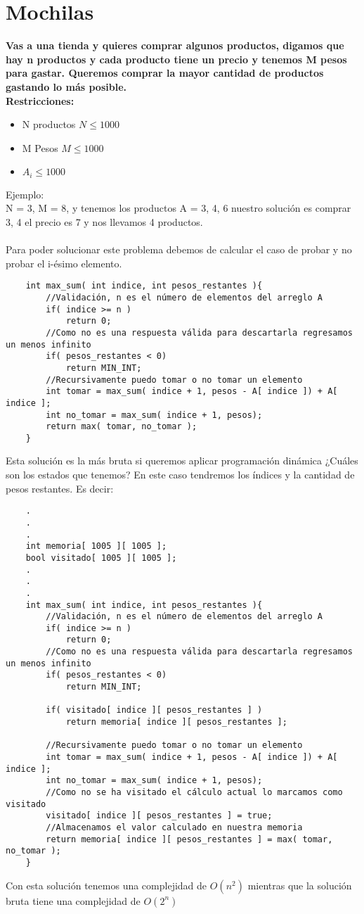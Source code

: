 \section{Mochilas}
\textbf{Vas a una tienda y quieres comprar algunos productos, digamos que hay n productos y cada producto tiene un precio y tenemos M pesos para gastar. Queremos comprar la mayor cantidad de productos gastando lo más posible.\\}
\textbf{Restricciones:}
\begin{itemize}
    \item N productos $N \leq 1000$
    \item M Pesos $M \leq 1000$
    \item $A_{i} \leq 1000$
\end{itemize}
Ejemplo:\\
N = 3, M = 8, y tenemos los productos A = {3, 4, 6} nuestro solución es comprar {3, 4} el precio es 7 y nos llevamos 4 productos.\\\\
Para poder solucionar este problema debemos de calcular el caso de probar y no probar el i-ésimo elemento. 
\begin{lstlisting}
    int max_sum( int indice, int pesos_restantes ){
        //Validación, n es el número de elementos del arreglo A
        if( indice >= n )
            return 0;
        //Como no es una respuesta válida para descartarla regresamos un menos infinito
        if( pesos_restantes < 0)
            return MIN_INT;
        //Recursivamente puedo tomar o no tomar un elemento
        int tomar = max_sum( indice + 1, pesos - A[ indice ]) + A[ indice ];
        int no_tomar = max_sum( indice + 1, pesos);
        return max( tomar, no_tomar );
    }
\end{lstlisting}

Esta solución es la más bruta si queremos aplicar programación dinámica ¿Cuáles son los estados que tenemos? En este caso tendremos los índices y la cantidad de pesos restantes. Es decir:
\begin{lstlisting}
    .
    .
    .
    int memoria[ 1005 ][ 1005 ];
    bool visitado[ 1005 ][ 1005 ];
    .
    .
    .
    int max_sum( int indice, int pesos_restantes ){
        //Validación, n es el número de elementos del arreglo A
        if( indice >= n )
            return 0;
        //Como no es una respuesta válida para descartarla regresamos un menos infinito
        if( pesos_restantes < 0)
            return MIN_INT;

        if( visitado[ indice ][ pesos_restantes ] )
            return memoria[ indice ][ pesos_restantes ];
        
        //Recursivamente puedo tomar o no tomar un elemento
        int tomar = max_sum( indice + 1, pesos - A[ indice ]) + A[ indice ];
        int no_tomar = max_sum( indice + 1, pesos);
        //Como no se ha visitado el cálculo actual lo marcamos como visitado
        visitado[ indice ][ pesos_restantes ] = true;
        //Almacenamos el valor calculado en nuestra memoria
        return memoria[ indice ][ pesos_restantes ] = max( tomar, no_tomar );
    }
\end{lstlisting}

Con esta solución tenemos una complejidad de $O(n^{2})$ mientras que la solución bruta tiene una complejidad de $O(2^{n})$